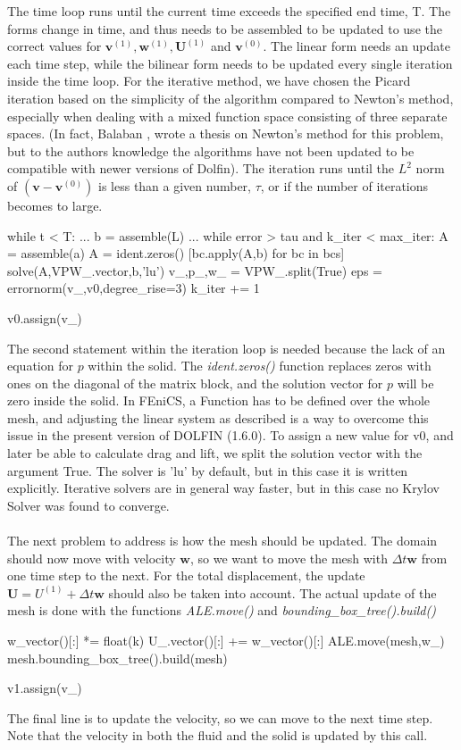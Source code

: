 The time loop runs until the current time exceeds the specified end time, T. The forms change in time, and thus needs to be assembled to be updated to use the correct values for $\mathbf{v}^{(1)}, \mathbf{w}^{(1)}, \mathbf{U}^{(1)}$ and $\mathbf{v}^{(0)}$. The linear form needs an update each time step, while the bilinear form needs to be updated every single iteration inside the time loop. For the iterative method, we have chosen the Picard iteration based on the simplicity of the algorithm compared to Newton's method, especially when dealing with a mixed function space consisting of three separate spaces. (In fact, Balaban \cite{Bala12}, wrote a thesis on Newton's method for this problem, but to the authors knowledge the algorithms have not been updated to be compatible with newer versions of Dolfin). The iteration runs until the $L^2$ norm of $(\mathbf{v}-\mathbf{v}^{(0)})$ is less than a given number, $\tau$, or if the number of iterations becomes to large. 

\begin{cverbatim}
while t < T:
	...
	b = assemble(L)
	...
	while error > tau and k_iter < max_iter:
		A = assemble(a)
		A = ident.zeros()
		[bc.apply(A,b) for bc in bcs]
		solve(A,VPW_.vector,b,'lu')
		v_,p_,w_ = VPW_.split(True)
		eps = errornorm(v_,v0,degree_rise=3)	
		k_iter += 1
		
		v0.assign(v_)
\end{cverbatim}
The second statement within the iteration loop is needed because the lack of an equation for $p$ within the solid. The \textit{ident.zeros()} function replaces zeros with ones on the diagonal of the matrix block, and the solution vector for $p$ will be zero inside the solid. In FEniCS, a Function has to be defined over the whole mesh, and adjusting the linear system as described is a way to overcome this issue in the present version of DOLFIN (1.6.0). To assign a new value for v0, and later be able to calculate drag and lift, we split the solution vector with the argument True. The solver is 'lu' by default, but in this case it is written explicitly. Iterative solvers are in general way faster, but in this case no Krylov Solver was found to converge. 
\\
\\
The next problem to address is how the mesh should be updated. The domain should now move with velocity $\mathbf{w}$, so we want to move the mesh with $\Delta t \mathbf{w}$ from one time step to the next. For the total displacement, the update $\mathbf{U} = U^{(1)} + \Delta t \mathbf{w}$ should also be taken into account. The actual update of the mesh is done with the functions \textit{ALE.move()} and \textit{bounding\_box\_tree().build()}
\begin{cverbatim}
	w_vector()[:] *= float(k)
	U_.vector()[:] += w_vector()[:]
	ALE.move(mesh,w_)
	mesh.bounding_box_tree().build(mesh)
	
	v1.assign(v_)
\end{cverbatim}
The final line is to update the velocity, so we can move to the next time step. Note that the velocity in both the fluid and the solid is updated by this call. \\

